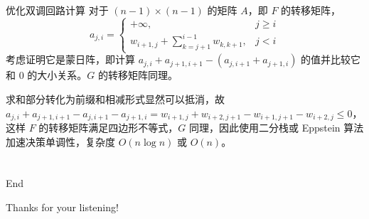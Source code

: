 \documentclass{beamer}
\begin{document}
\begin{frame}{优化双调回路计算}
	对于 $(n-1) \times (n-1)$ 的矩阵 $A$，即 $F$ 的转移矩阵，$$a_{j,i} = \begin{cases}
	+\infty, &j\geq i\\
	w_{i+1,j}+\sum_{k=j+1}^{i-1}w_{k,k+1}, & j<i
	\end{cases}$$考虑证明它是蒙日阵，即计算 $a_{j,i}+a_{j+1,i+1}-(a_{j,i+1}+a_{j+1,i})$ 的值并比较它和 $0$ 的大小关系。$G$ 的转移矩阵同理。
	
	求和部分转化为前缀和相减形式显然可以抵消，故 $a_{j,i}+a_{j+1,i+1}-a_{j,i+1}-a_{j+1,i}=w_{i+1,j}+w_{i+2,j+1}-w_{i+1,j+1}-w_{i+2,j} \leq 0$，这样 $F$ 的转移矩阵满足四边形不等式，$G$ 同理，因此使用二分栈或 Eppstein 算法加速决策单调性，复杂度 $O(n \log n)$ 或 $O(n)$。
\end{frame}
\section{}
\begin{frame}{End}
\begin{center}
\begin{huge}
Thanks for your listening!
\end{huge}
\end{center}
\end{frame}
\end{document}
